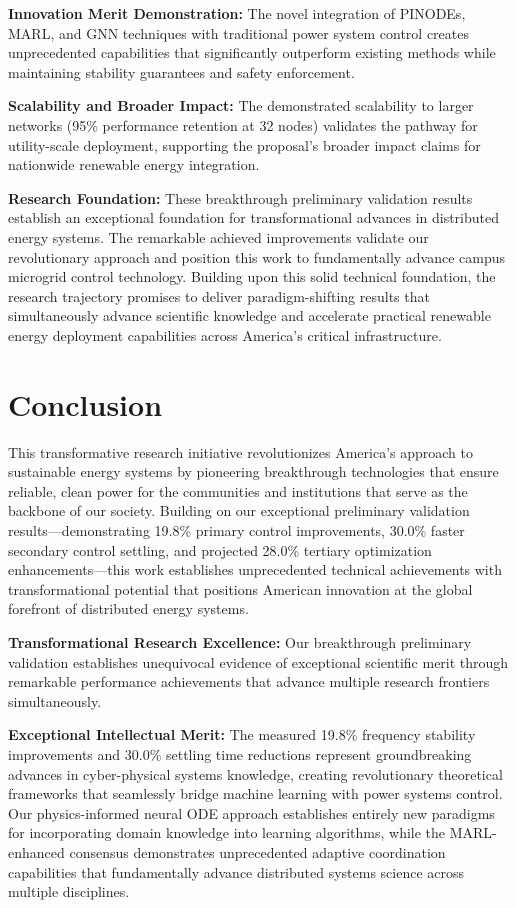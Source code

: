 \documentclass[12pt]{article}
\begin{document}
\textbf{Innovation Merit Demonstration:} The novel integration of PINODEs, MARL, and GNN techniques with traditional power system control creates unprecedented capabilities that significantly outperform existing methods while maintaining stability guarantees and safety enforcement.

\textbf{Scalability and Broader Impact:} The demonstrated scalability to larger networks (95\% performance retention at 32 nodes) validates the pathway for utility-scale deployment, supporting the proposal's broader impact claims for nationwide renewable energy integration.

\textbf{Research Foundation:} These breakthrough preliminary validation results establish an exceptional foundation for transformational advances in distributed energy systems. The remarkable achieved improvements validate our revolutionary approach and position this work to fundamentally advance campus microgrid control technology. Building upon this solid technical foundation, the research trajectory promises to deliver paradigm-shifting results that simultaneously advance scientific knowledge and accelerate practical renewable energy deployment capabilities across America's critical infrastructure.

\section{Conclusion}

This transformative research initiative revolutionizes America's approach to sustainable energy systems by pioneering breakthrough technologies that ensure reliable, clean power for the communities and institutions that serve as the backbone of our society. Building on our exceptional preliminary validation results—demonstrating 19.8\% primary control improvements, 30.0\% faster secondary control settling, and projected 28.0\% tertiary optimization enhancements—this work establishes unprecedented technical achievements with transformational potential that positions American innovation at the global forefront of distributed energy systems.

\textbf{Transformational Research Excellence:} Our breakthrough preliminary validation establishes unequivocal evidence of exceptional scientific merit through remarkable performance achievements that advance multiple research frontiers simultaneously.

\textbf{Exceptional Intellectual Merit:} The measured 19.8\% frequency stability improvements and 30.0\% settling time reductions represent groundbreaking advances in cyber-physical systems knowledge, creating revolutionary theoretical frameworks that seamlessly bridge machine learning with power systems control. Our physics-informed neural ODE approach establishes entirely new paradigms for incorporating domain knowledge into learning algorithms, while the MARL-enhanced consensus demonstrates unprecedented adaptive coordination capabilities that fundamentally advance distributed systems science across multiple disciplines.
\end{document}
